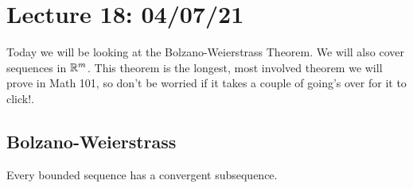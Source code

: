 \section{Lecture 18: 04/07/21}

Today we will be looking at the Bolzano-Weierstrass Theorem. We will also cover sequences in $\mathbb{R}^m$. This theorem is the longest, most involved theorem we will prove in Math 101, so don't be worried if it takes a couple of going's over for it to click!.

\subsection{Bolzano-Weierstrass}

\begin{theorem}
Every bounded sequence has a convergent subsequence.
\end{theorem}

